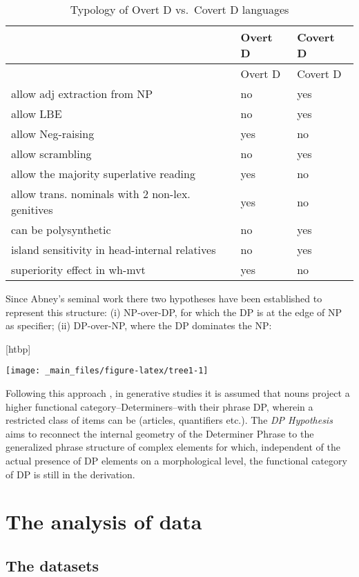 \documentclass[
  a4paper,
  twoside,
  12pt,
  chapterprefix=false,
  listof=flat]{scrartcl}
\makeatletter
\def\fps@figure{htbp}
\renewenvironment{figure}[1][\fps@figure]{
  \edef\@tempa{\noexpand\@float{figure}[#1]} 
  \@tempa
  \sffamily
}{
  \end@float
}
\theoremstyle{plain} %
\theoremstyle{definition}
\theoremstyle{remark}
\makeatother
\begin{document}
\begin{longtable}[]{@{}lll@{}}
\caption{Typology of Overt D vs.~Covert D languages}\tabularnewline
\toprule
& Overt D & Covert D\tabularnewline
\midrule
\endfirsthead
\toprule
& Overt D & Covert D\tabularnewline
\midrule
\endhead
allow adj extraction from NP & no & yes\tabularnewline
allow LBE & no & yes\tabularnewline
allow Neg-raising & yes & no\tabularnewline
allow scrambling & no & yes\tabularnewline
allow the majority superlative reading & yes & no\tabularnewline
allow trans. nominals with 2 non-lex. genitives & yes & no\tabularnewline
can be polysynthetic & no & yes\tabularnewline
island sensitivity in head-internal relatives & no & yes\tabularnewline
superiority effect in wh-mvt & yes & no\tabularnewline
\bottomrule
\end{longtable}

Since Abney's seminal work \citep{abney1987} there two hypotheses have been established to represent this structure: (i) NP-over-DP, for which the DP is at the edge of NP as specifier; (ii) DP-over-NP, where the DP dominates the NP:

\begin{figure}

{\centering \texttt{[image: \_main\_files/figure-latex/tree1-1]} 

}

\caption{Phrase structure in NP-over-DP vs. DP-over-NP Hypotheses}\label{fig:tree1}
\end{figure}

Following this approach \citep{abney1987}, in generative studies it is assumed that nouns project a higher functional category--Determiners--with their phrase DP, wherein a restricted class of items can be (articles, quantifiers etc.).
The \emph{DP Hypothesis} aims to reconnect the internal geometry of the Determiner Phrase to the generalized phrase structure of complex elements \citep{bernstein2008, zamparelli1995} for which, independent of the actual presence of DP elements on a morphological level, the functional category of DP is still in the derivation.

\hypertarget{sec:caseStudy}{%
\section{The analysis of data}\label{sec:caseStudy}}

\hypertarget{the-datasets}{%
\subsection{The datasets}\label{the-datasets}}
\end{document}
